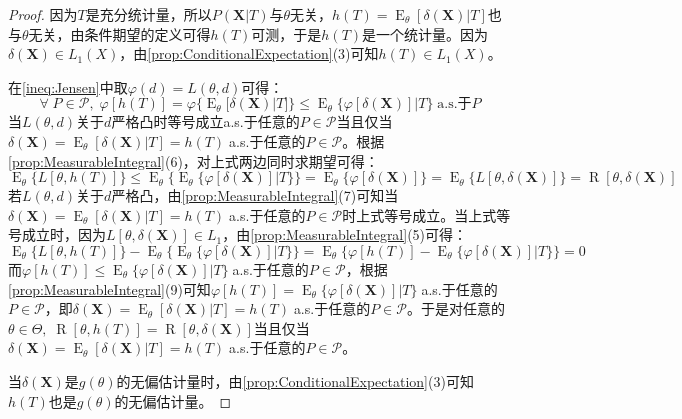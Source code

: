 \begin{proof}
	因为$T$是充分统计量，所以$P(\mathbf{X}|T)$与$\theta$无关，$h(T)=\operatorname{E}_{\theta}[\delta(\mathbf{X})|T]$也与$\theta$无关，由条件期望的定义可得$h(T)$可测，于是$h(T)$是一个统计量。因为$\delta(\mathbf{X})\in L_1(X)$，由\cref{prop:ConditionalExpectation}(3)可知$h(T)\in L_1(X)$。\par
	在\cref{ineq:Jensen}中取$\varphi(d)=L(\theta,d)$可得：
	\begin{equation*}
		\forall\;P\in\mathscr{P},\;\varphi[h(T)]=\varphi\{\operatorname{E}_{\theta}[\delta(\mathbf{X})|T]\}\leqslant\operatorname{E}_{\theta}\{\varphi[\delta(\mathbf{X})]|T\}\;\text{a.s.于}P
	\end{equation*}
	当$L(\theta,d)$关于$d$严格凸时等号成立a.s.于任意的$P\in\mathscr{P}$当且仅当$\delta(\mathbf{X})=\operatorname{E}_{\theta}[\delta(\mathbf{X})|T]=h(T)\;$a.s.于任意的$P\in\mathscr{P}$。根据\cref{prop:MeasurableIntegral}(6)，对上式两边同时求期望可得：
	\begin{equation*}
		\operatorname{E}_{\theta}\{L[\theta,h(T)]\}\leqslant\operatorname{E}_{\theta}\Big\{\operatorname{E}_{\theta}\{\varphi[\delta(\mathbf{X})]|T\}\Big\}=\operatorname{E}_{\theta}\{\varphi[\delta(\mathbf{X})]\}=\operatorname{E}_{\theta}\{L[\theta,\delta(\mathbf{X})]\}=\operatorname{R}[\theta,\delta(\mathbf{X})]
	\end{equation*}
	若$L(\theta,d)$关于$d$严格凸，由\cref{prop:MeasurableIntegral}(7)可知当$\delta(\mathbf{X})=\operatorname{E}_{\theta}[\delta(\mathbf{X})|T]=h(T)\;$a.s.于任意的$P\in\mathscr{P}$时上式等号成立。当上式等号成立时，因为$L[\theta,\delta(\mathbf{X})]\in L_1$，由\cref{prop:MeasurableIntegral}(5)可得：
	\begin{equation*}
		\operatorname{E}_{\theta}\{L[\theta,h(T)]\}-\operatorname{E}_{\theta}\Big\{\operatorname{E}_{\theta}\{\varphi[\delta(\mathbf{X})]|T\}\Big\}=\operatorname{E}_{\theta}\Big\{\varphi[h(T)]-\operatorname{E}_{\theta}\{\varphi[\delta(\mathbf{X})]|T\}\Big\}=0
	\end{equation*}
	而$\varphi[h(T)]\leqslant\operatorname{E}_{\theta}\{\varphi[\delta(\mathbf{X})]|T\}\;$a.s.于任意的$P\in\mathscr{P}$，根据\cref{prop:MeasurableIntegral}(9)可知$\varphi[h(T)]=\operatorname{E}_{\theta}\{\varphi[\delta(\mathbf{X})]|T\}\;$a.s.于任意的$P\in\mathscr{P}$，即$\delta(\mathbf{X})=\operatorname{E}_{\theta}[\delta(\mathbf{X})|T]=h(T)\;$a.s.于任意的$P\in\mathscr{P}$。于是对任意的$\theta\in\Theta,\;\operatorname{R}[\theta,h(T)]=\operatorname{R}[\theta,\delta(\mathbf{X})]$当且仅当$\delta(\mathbf{X})=\operatorname{E}_{\theta}[\delta(\mathbf{X})|T]=h(T)\;$a.s.于任意的$P\in\mathscr{P}$。\par
	当$\delta(\mathbf{X})$是$g(\theta)$的无偏估计量时，由\cref{prop:ConditionalExpectation}(3)可知$h(T)$也是$g(\theta)$的无偏估计量。
\end{proof}
